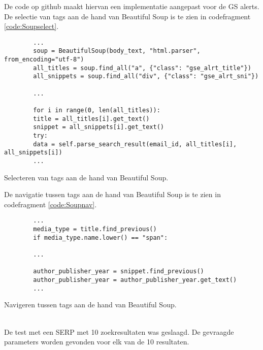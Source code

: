 De code op github \textcite{DepaepeBeautifulsoup2025} maakt hiervan een implementatie aangepast voor de GS alerts. 
De selectie van tags aan de hand van Beautiful Soup is te zien in codefragment \ref{code:Soupselect}.
\begin{listing}[h!]
    \begin{verbatim}
        ...
        soup = BeautifulSoup(body_text, "html.parser", from_encoding="utf-8")
        all_titles = soup.find_all("a", {"class": "gse_alrt_title"})
        all_snippets = soup.find_all("div", {"class": "gse_alrt_sni"})
        
        ...
        
        for i in range(0, len(all_titles)):
        title = all_titles[i].get_text()
        snippet = all_snippets[i].get_text()
        try:
        data = self.parse_search_result(email_id, all_titles[i], all_snippets[i])
        ...
    \end{verbatim}
    \caption[Beautiful Soup tag selection]{Selecteren van tags aan de hand van Beautiful Soup.}
    \label{code:Soupselect}
\end{listing}
De navigatie tussen tags aan de hand van Beautiful Soup is te zien in codefragment \ref{code:Soupnav}.
\begin{listing}[h!]
    \begin{verbatim}
        ...
        media_type = title.find_previous()
        if media_type.name.lower() == "span":
        
        ...
        
        author_publisher_year = snippet.find_previous()
        author_publisher_year = author_publisher_year.get_text()
        ...
    \end{verbatim}
    \caption[Beautiful Soup navigatie]{Navigeren tussen tags aan de hand van Beautiful Soup.}
    \label{code:Soupnav}
\end{listing}
\\
De test met een SERP met 10 zoekresultaten was geslaagd. De gevraagde parameters worden gevonden voor elk van de 10 resultaten.
